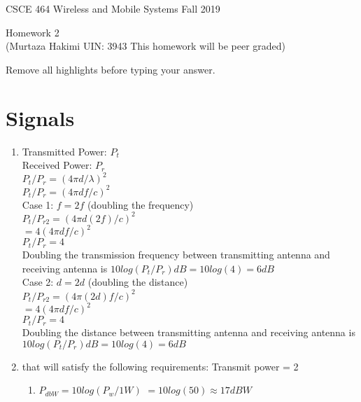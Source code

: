 \documentclass[11pt]{article}
\begin{document}
\newcommand{\answer}[1]{\mbox{~}}

{\large  CSCE 464 Wireless and Mobile Systems  \hfill Fall 2019\\
 \begin{center}
   Homework 2 \\
   (Murtaza Hakimi UIN: 3943 This homework will be peer graded) \\
    \end{center}
}

Remove all highlights before typing your answer.

\section{Signals}
\begin{enumerate}[label=(\alph*)]
\item {
	Transmitted Power: $P_t$ \\
	Received Power: $P_r$ \\
	$P_t/P_r = (4\pi d / \lambda)^2$ \\
	$P_t/P_r = (4\pi d f/ c )^2$ \\
	
	Case 1: $f = 2f$ (doubling the frequency) \\ 
	$P_t/P_{r2} = (4\pi d (2f) / c)^2$ \\
	$= 4(4\pi df/ c)^2$ \\
	$P_t/P_r = 4$ \\
	
	Doubling the transmission frequency between transmitting antenna and receiving antenna is
	$10log(P_t/P_r)dB = 10log(4) = 6dB$ \\

	Case 2: $d=2d$ (doubling the distance) \\
	$P_t/P_{r2} = (4\pi (2d)f / c)^2$ \\
	$= 4(4\pi df/ c)^2$ \\
	$P_t/P_r = 4$ \\
	
	Doubling the distance between transmitting antenna and receiving antenna is
	$10log(P_t/P_r)dB = 10log(4) = 6dB$ \\
}
\item {that will satisfy the following requirements: Transmit power = 2
	\begin{enumerate}[label=(\roman*)]
	\item {
		$P_{dbW} = 10log(P_w/1W)$
		$= 10log(50) \approx 17dBW$ \\
		
}
\end{enumerate}}
\end{enumerate}
\end{document}
